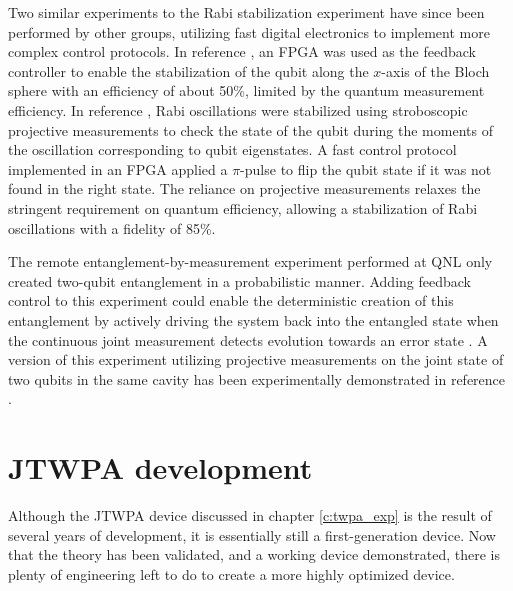 Two similar experiments to the Rabi stabilization experiment have since been performed by other groups, utilizing fast digital electronics to implement more complex control protocols.  In reference \cite{DeLange2014}, an FPGA was used as the feedback controller to enable the stabilization of the qubit along the $x$-axis of the Bloch sphere with an efficiency of about 50\%, limited by the quantum measurement efficiency.  In reference \cite{campagne-ibarcq_persistent_2013}, Rabi oscillations were stabilized using stroboscopic projective measurements to check the state of the qubit during the moments of the oscillation corresponding to qubit eigenstates.  A fast control protocol implemented in an FPGA applied a $\pi$-pulse to flip the qubit state if it was not found in the right state.  The reliance on projective measurements relaxes the stringent requirement on quantum efficiency, allowing a stabilization of Rabi oscillations with a fidelity of 85\%.

The remote entanglement-by-measurement experiment performed at QNL \cite{Roch2014} only created two-qubit entanglement in a probabilistic manner.  Adding feedback control to this experiment could enable the deterministic creation of this entanglement by actively driving the system back into the entangled state when the continuous joint measurement detects evolution towards an error state \cite{Sarovar:2005kx,PhysRevLett.111.170404}.  A version of this experiment utilizing projective measurements on the joint state of two qubits in the same cavity has been experimentally demonstrated in reference \cite{Riste2013}.

\section{JTWPA development}

Although the JTWPA device discussed in chapter \ref{c:twpa_exp} is the result of several years of development, it is essentially still a first-generation device.  Now that the theory has been validated, and a working device demonstrated, there is plenty of engineering left to do to create a more highly optimized device.

